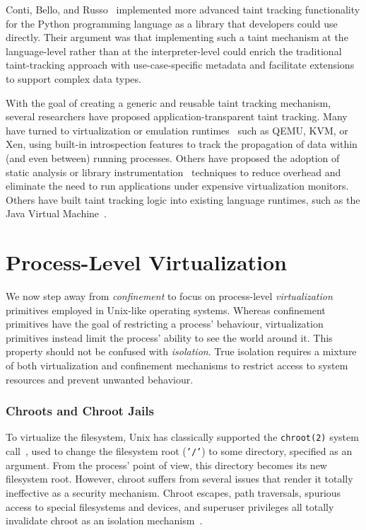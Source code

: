 Conti, Bello, and Russo~\cite{conti2010_taint, bello2012_taint} implemented more advanced
taint tracking functionality for the Python programming language as a library that
developers could use directly. Their argument was that implementing such a taint mechanism
at the language-level rather than at the interpreter-level could enrich the traditional
taint-tracking approach with use-case-specific metadata and facilitate extensions to
support complex data types.

With the goal of creating a generic and reusable taint tracking mechanism, several
researchers have proposed application-transparent taint tracking. Many have turned to
virtualization or emulation runtimes~\cite{ermolinskiy2010_towards, zavou2011_taint,
yin2007_panorama} such as QEMU, KVM, or Xen, using built-in introspection features to
track the propagation of data within (and even between) running processes. Others have
proposed the adoption of static analysis or library
instrumentation~\cite{zhu2011_taint_eraser, cheng2006_taint, clause2007_taint} techniques
to reduce overhead and eliminate the need to run applications under expensive
virtualization monitors. Others have built taint tracking logic into existing language
runtimes, such as the Java Virtual Machine~\cite{chin2009_efficient}.



\section{Process-Level Virtualization}%
\label{s:virtualization}

We now step away from \textit{confinement} to focus on process-level
\textit{virtualization} primitives employed in Unix-like operating systems. Whereas
confinement primitives have the goal of restricting a process' behaviour, virtualization
primitives instead limit the process' ability to see the world around it. This property
should not be confused with \textit{isolation}. True isolation requires a mixture of both
virtualization and confinement mechanisms to restrict access to system resources and
prevent unwanted behaviour.

\subsubsection*{Chroots and Chroot Jails}

To virtualize the filesystem, Unix has classically supported the \texttt{chroot(2)} system
call~\cite{mcfearin2011_chroot_jails}, used to change the filesystem root (\texttt{'/'})
to some directory, specified as an argument. From the process' point of view, this
directory becomes its new filesystem root. However, chroot suffers from several issues
that render it totally ineffective as a security mechanism. Chroot escapes, path
traversals, spurious access to special filesystems and devices, and superuser privileges
all totally invalidate chroot as an isolation mechanism~\cite{mcfearin2011_chroot_jails}.

